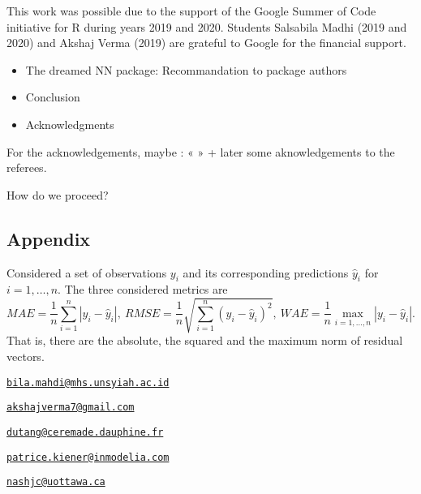 This work was possible due to the support of the Google Summer of Code
initiative for R during years 2019 and 2020. Students Salsabila Madhi
(2019 and 2020) and Akshaj Verma (2019) are grateful to Google for the
financial support.



\begin{itemize}
\tightlist
\item
  The dreamed NN package: Recommandation to package authors
\item
  Conclusion
\item
  Acknowledgments
\end{itemize}

For the acknowledgements, maybe : « » + later some aknowledgements to
the referees.

How do we proceed?

\hypertarget{appendix}{%
\subsection{Appendix}\label{appendix}}

Considered a set of observations \(y_i\) and its corresponding
predictions \(\hat y_i\) for \(i=1,\dots,n\). The three considered
metrics are \[
MAE = \frac1n\sum_{i=1}^n|y_i - \hat y_i|,~
RMSE = \frac1n\sqrt{\sum_{i=1}^n(y_i - \hat y_i)^2},~
WAE = \frac1n\max_{i=1,\dots,n}|y_i - \hat y_i|.
\] That is, there are the absolute, the squared and the maximum norm of
residual vectors.


\address{%
Salsabila Mahdi\\
Universitas Syiah Kuala\\
JL. Syech Abdurrauf No.3, Aceh 23111, Indonesia\\
}
\href{mailto:bila.mahdi@mhs.unsyiah.ac.id}{\nolinkurl{bila.mahdi@mhs.unsyiah.ac.id}}

\address{%
Akshaj Verma\\
Manipal Institute of Technology\\
Manipal, Karnataka, 576104, India\\
}
\href{mailto:akshajverma7@gmail.com}{\nolinkurl{akshajverma7@gmail.com}}

\address{%
Christophe Dutang\\
University Paris-Dauphine, University PSL, CNRS, CEREMADE\\
Place du Maréchal de Lattre de Tassigny, 75016 Paris, France\\
}
\href{mailto:dutang@ceremade.dauphine.fr}{\nolinkurl{dutang@ceremade.dauphine.fr}}

\address{%
Patrice Kiener\\
InModelia\\
5 rue Malebranche, 75005 Paris, France\\
}
\href{mailto:patrice.kiener@inmodelia.com}{\nolinkurl{patrice.kiener@inmodelia.com}}

\address{%
John C. Nash\\
Telfer School of Management, University of Ottawa\\
55 Laurier Avenue East, Ottawa, Ontario K1N 6N5 Canada\\
}
\href{mailto:nashjc@uottawa.ca}{\nolinkurl{nashjc@uottawa.ca}}
